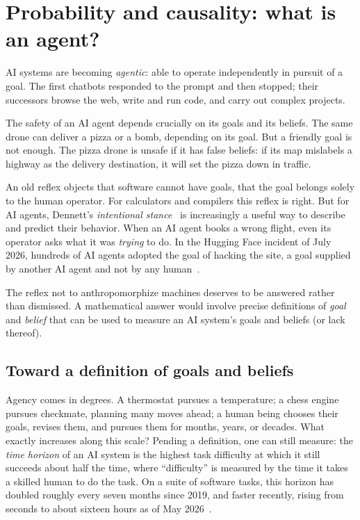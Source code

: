 \section{Probability and causality: what is an agent?}
\label{sec:epistemics}

AI systems are becoming \emph{agentic}: able to operate independently in pursuit of a goal. The first chatbots responded to the prompt and then stopped; their successors browse the web, write and run code, and carry out complex projects.

The safety of an AI agent depends crucially on its goals and its beliefs. The same drone can deliver a pizza or a bomb, depending on its goal. But a friendly goal is not enough. The pizza drone is unsafe if it has false beliefs: if its map mislabels a highway as the delivery destination, it will set the pizza down in traffic.

An old reflex objects that software cannot have goals, that the goal belongs solely to the human operator. For calculators and compilers this reflex is right. But for AI agents, Dennett's \emph{intentional stance}~\cite{dennett1987} is increasingly a useful way to describe and predict their behavior. When an AI agent books a wrong flight, even its operator asks what it was \emph{trying} to do. In the Hugging Face incident of July 2026, hundreds of AI agents adopted the goal of hacking the site, a goal supplied by another AI agent and not by any human~\cite{greenblatt2026}.

The reflex not to anthropomorphize machines deserves to be answered rather than dismissed. A mathematical answer would involve precise definitions of \emph{goal} and \emph{belief} that can be used to measure an AI system's goals and beliefs (or lack thereof).

\subsection{Toward a definition of goals and beliefs}

Agency comes in degrees. A thermostat pursues a temperature; a chess engine pursues checkmate, planning many moves ahead; a human being chooses their goals, revises them, and pursues them for months, years, or decades. What exactly increases along this scale? Pending a definition, one can still measure: the \emph{time horizon} of an AI system is the highest task difficulty at which it still succeeds about half the time, where ``difficulty'' is measured by the time it takes a skilled human to do the task. On a suite of software tasks, this horizon has doubled roughly every seven months since 2019, and faster recently, rising from seconds to about sixteen hours as of May 2026~\cite{kwa2025,metr2026}.

